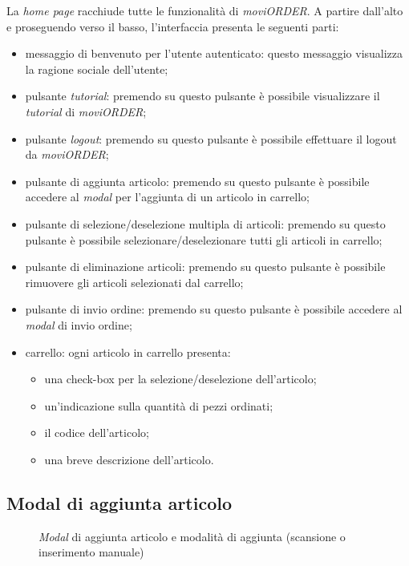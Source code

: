 La \textit{home page} racchiude tutte le funzionalità di \textit{moviORDER}. A partire dall'alto e proseguendo verso il basso, l'interfaccia presenta le seguenti parti:
\begin{itemize}
	\item messaggio di benvenuto per l'utente autenticato: questo messaggio visualizza la ragione sociale dell'utente;
	\item pulsante \textit{tutorial}: premendo su questo pulsante è possibile visualizzare il \textit{tutorial} di \textit{moviORDER};
	\item pulsante \textit{logout}: premendo su questo pulsante è possibile effettuare il logout da \textit{moviORDER};
	\item pulsante di aggiunta articolo: premendo su questo pulsante è possibile accedere al \textit{modal} per l'aggiunta di un articolo in carrello; 
	\item pulsante di selezione/deselezione multipla di articoli: premendo su questo pulsante è possibile selezionare/deselezionare tutti gli articoli in carrello;
	\item pulsante di eliminazione articoli: premendo su questo pulsante è possibile rimuovere gli articoli selezionati dal carrello;
	\item pulsante di invio ordine: premendo su questo pulsante è possibile accedere al \textit{modal} di invio ordine;
	\item carrello: ogni articolo in carrello presenta:
	\begin{itemize}
		\item una check-box per la selezione/deselezione dell'articolo;
		\item un'indicazione sulla quantità di pezzi ordinati;
		\item il codice dell'articolo;
		\item una breve descrizione dell'articolo.
	\end{itemize}
\end{itemize}

\subsection{Modal di aggiunta articolo}

\begin{figure}[!h] 
    \centering 
    \caption{\textit{Modal} di aggiunta articolo e modalità di aggiunta (scansione o inserimento manuale)}
\end{figure}

